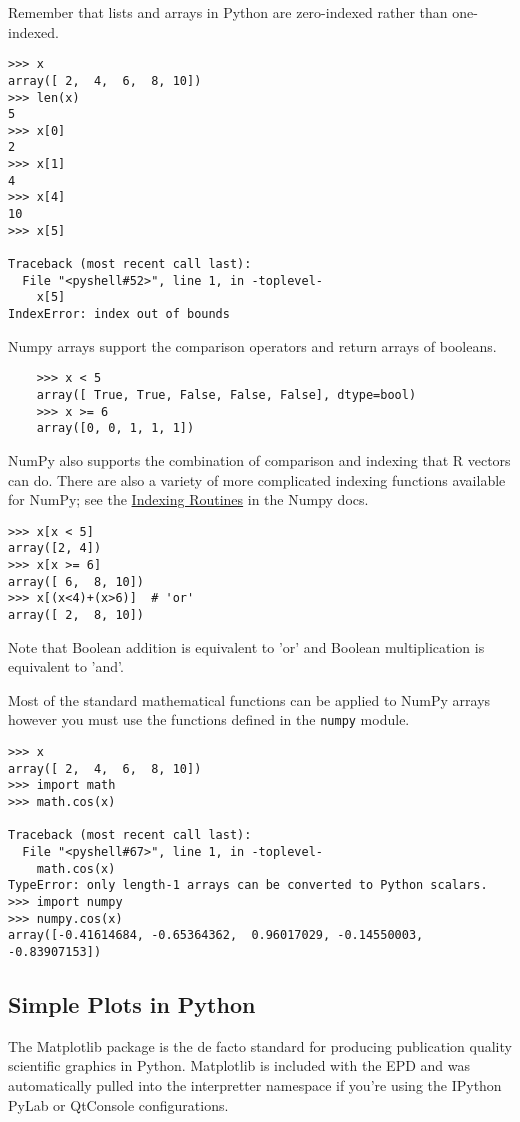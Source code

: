 Remember that lists and arrays in Python are zero-indexed rather than
one-indexed.

\begin{lstlisting}
>>> x
array([ 2,  4,  6,  8, 10])
>>> len(x)
5
>>> x[0]
2
>>> x[1]
4
>>> x[4]
10
>>> x[5]

Traceback (most recent call last):
  File "<pyshell#52>", line 1, in -toplevel-
    x[5]
IndexError: index out of bounds
\end{lstlisting}
Numpy arrays support the comparison operators and return arrays of
booleans.

\begin{lstlisting}
    >>> x < 5 
    array([ True, True, False, False, False], dtype=bool)
    >>> x >= 6 
    array([0, 0, 1, 1, 1])
\end{lstlisting}
NumPy also supports the combination of comparison and indexing that R
vectors can do. There are also a variety of more complicated indexing
functions available for NumPy; see the
\href{http://docs.scipy.org/doc/numpy/reference/routines.indexing.html}{Indexing
Routines} in the Numpy docs.

\begin{lstlisting}
>>> x[x < 5]
array([2, 4])
>>> x[x >= 6]
array([ 6,  8, 10])
>>> x[(x<4)+(x>6)]  # 'or'
array([ 2,  8, 10])
\end{lstlisting}
Note that Boolean addition is equivalent to 'or' and Boolean
multiplication is equivalent to 'and'.

Most of the standard mathematical functions can be applied to NumPy
arrays however you must use the functions defined in the
\lstinline!numpy! module.

\begin{lstlisting}
>>> x
array([ 2,  4,  6,  8, 10])
>>> import math
>>> math.cos(x)

Traceback (most recent call last):
  File "<pyshell#67>", line 1, in -toplevel-
    math.cos(x)
TypeError: only length-1 arrays can be converted to Python scalars.
>>> import numpy
>>> numpy.cos(x)
array([-0.41614684, -0.65364362,  0.96017029, -0.14550003, -0.83907153])
\end{lstlisting}
\subsection{Simple Plots in Python}

The Matplotlib package is the de facto standard for producing
publication quality scientific graphics in Python. Matplotlib is
included with the EPD and was automatically pulled into the interpretter
namespace if you're using the IPython PyLab or QtConsole configurations.

